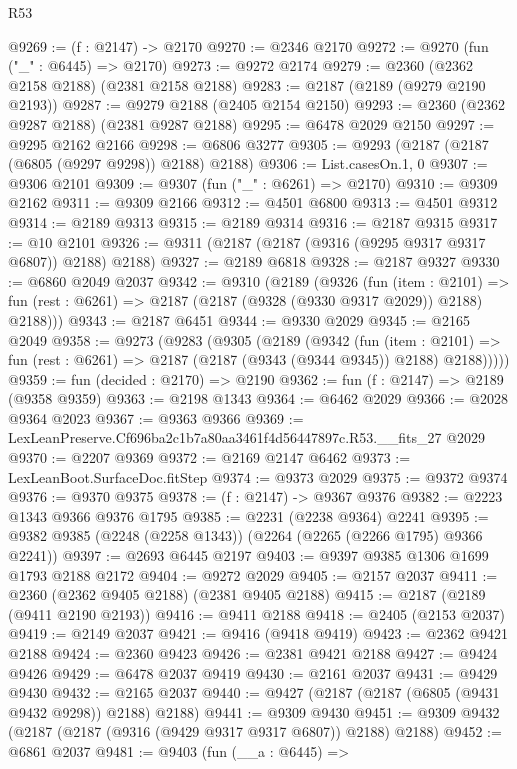 \begin{lexlean}{R53}
\begin{coremodule}
@9269 := (f : @2147) -> @2170
@9270 := @2346 @2170
@9272 := @9270 (fun ("_" : @6445) => @2170)
@9273 := @9272 @2174
@9279 := @2360 (@2362 @2158 @2188) (@2381 @2158 @2188)
@9283 := @2187 (@2189 (@9279 @2190 @2193))
@9287 := @9279 @2188 (@2405 @2154 @2150)
@9293 := @2360 (@2362 @9287 @2188) (@2381 @9287 @2188)
@9295 := @6478 @2029 @2150
@9297 := @9295 @2162 @2166
@9298 := @6806 @3277
@9305 := @9293 (@2187 (@2187 (@6805 (@9297 @9298)) @2188) @2188)
@9306 := List.casesOn.{1, 0}
@9307 := @9306 @2101
@9309 := @9307 (fun ("_" : @6261) => @2170)
@9310 := @9309 @2162
@9311 := @9309 @2166
@9312 := @4501 @6800
@9313 := @4501 @9312
@9314 := @2189 @9313
@9315 := @2189 @9314
@9316 := @2187 @9315
@9317 := @10 @2101
@9326 := @9311 (@2187 (@2187 (@9316 (@9295 @9317 @9317 @6807)) @2188) @2188)
@9327 := @2189 @6818
@9328 := @2187 @9327
@9330 := @6860 @2049 @2037
@9342 := @9310
    (@2189
      (@9326
        (fun (item : @2101) =>
        fun (rest : @6261) => @2187 (@2187 (@9328 (@9330 @9317 @2029)) @2188) @2188)))
@9343 := @2187 @6451
@9344 := @9330 @2029
@9345 := @2165 @2049
@9358 := @9273
    (@9283
      (@9305
        (@2189
          (@9342
            (fun (item : @2101) =>
            fun (rest : @6261) => @2187 (@2187 (@9343 (@9344 @9345)) @2188) @2188)))))
@9359 := fun (decided : @2170) => @2190
@9362 := fun (f : @2147) => @2189 (@9358 @9359)
@9363 := @2198 @1343
@9364 := @6462 @2029
@9366 := @2028 @9364 @2023
@9367 := @9363 @9366
@9369 := LexLeanPreserve.Cf696ba2c1b7a80aa3461f4d56447897c.R53.__fits_27 @2029
@9370 := @2207 @9369
@9372 := @2169 @2147 @6462
@9373 := LexLeanBoot.SurfaceDoc.fitStep
@9374 := @9373 @2029
@9375 := @9372 @9374
@9376 := @9370 @9375
@9378 := (f : @2147) -> @9367 @9376
@9382 := @2223 @1343 @9366 @9376 @1795
@9385 := @2231 (@2238 @9364) @2241
@9395 := @9382 @9385 (@2248 (@2258 @1343)) (@2264 (@2265 (@2266 @1795) @9366 @2241))
@9397 := @2693 @6445 @2197
@9403 := @9397 @9385 @1306 @1699 @1793 @2188 @2172
@9404 := @9272 @2029
@9405 := @2157 @2037
@9411 := @2360 (@2362 @9405 @2188) (@2381 @9405 @2188)
@9415 := @2187 (@2189 (@9411 @2190 @2193))
@9416 := @9411 @2188
@9418 := @2405 (@2153 @2037)
@9419 := @2149 @2037
@9421 := @9416 (@9418 @9419)
@9423 := @2362 @9421 @2188
@9424 := @2360 @9423
@9426 := @2381 @9421 @2188
@9427 := @9424 @9426
@9429 := @6478 @2037 @9419
@9430 := @2161 @2037
@9431 := @9429 @9430
@9432 := @2165 @2037
@9440 := @9427 (@2187 (@2187 (@6805 (@9431 @9432 @9298)) @2188) @2188)
@9441 := @9309 @9430
@9451 := @9309 @9432 (@2187 (@2187 (@9316 (@9429 @9317 @9317 @6807)) @2188) @2188)
@9452 := @6861 @2037
@9481 := @9403
    (fun (__a : @6445) =>

\end{coremodule}
\end{lexlean}
